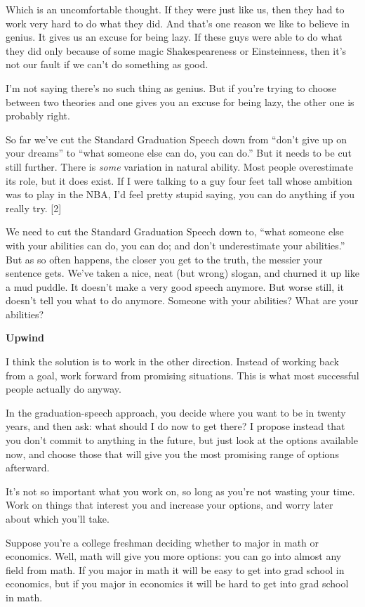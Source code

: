 Which is an uncomfortable thought. If they were just like us, then they
had to work very hard to do what they did. And that's one reason we like
to believe in genius. It gives us an excuse for being lazy. If these
guys were able to do what they did only because of some magic
Shakespeareness or Einsteinness, then it's not our fault if we can't do
something as good.

I'm not saying there's no such thing as genius. But if you're trying to
choose between two theories and one gives you an excuse for being lazy,
the other one is probably right.

So far we've cut the Standard Graduation Speech down from ``don't give
up on your dreams'' to ``what someone else can do, you can do.'' But it
needs to be cut still further. There is \emph{some} variation in natural
ability. Most people overestimate its role, but it does exist. If I were
talking to a guy four feet tall whose ambition was to play in the NBA,
I'd feel pretty stupid saying, you can do anything if you really try.
{[}2{]}

We need to cut the Standard Graduation Speech down to, ``what someone
else with your abilities can do, you can do; and don't underestimate
your abilities.'' But as so often happens, the closer you get to the
truth, the messier your sentence gets. We've taken a nice, neat (but
wrong) slogan, and churned it up like a mud puddle. It doesn't make a
very good speech anymore. But worse still, it doesn't tell you what to
do anymore. Someone with your abilities? What are your abilities?

\textbf{Upwind}

I think the solution is to work in the other direction. Instead of
working back from a goal, work forward from promising situations. This
is what most successful people actually do anyway.

In the graduation-speech approach, you decide where you want to be in
twenty years, and then ask: what should I do now to get there? I propose
instead that you don't commit to anything in the future, but just look
at the options available now, and choose those that will give you the
most promising range of options afterward.

It's not so important what you work on, so long as you're not wasting
your time. Work on things that interest you and increase your options,
and worry later about which you'll take.

Suppose you're a college freshman deciding whether to major in math or
economics. Well, math will give you more options: you can go into almost
any field from math. If you major in math it will be easy to get into
grad school in economics, but if you major in economics it will be hard
to get into grad school in math.

